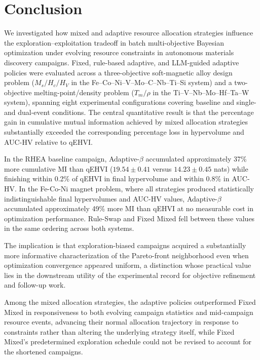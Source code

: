 \section{Conclusion}

We investigated how mixed and adaptive resource allocation strategies influence the exploration--exploitation tradeoff in batch multi-objective Bayesian optimization under evolving resource constraints in autonomous materials discovery campaigns. Fixed, rule-based adaptive, and LLM-guided adaptive policies were evaluated across a three-objective soft-magnetic alloy design problem ($M_s/H_c/H_V$ in the Fe--Co--Ni--V--Mo--C--Nb--Ti--Si system) and a two-objective melting-point/density problem ($T_m/\rho$ in the Ti--V--Nb--Mo--Hf--Ta--W system), spanning eight experimental configurations covering baseline and single- and dual-event conditions.
The central quantitative result is that the percentage gain in cumulative mutual information achieved by mixed allocation strategies substantially exceeded the corresponding percentage loss in hypervolume and AUC-HV relative to qEHVI. 

In the RHEA baseline campaign, Adaptive-$\beta$ accumulated approximately 37\% more cumulative MI than qEHVI ($19.54 \pm 0.41$ versus $14.23 \pm 0.45$ nats) while finishing within 0.2\% of qEHVI in final hypervolume and within 0.8\% in AUC-HV. In the Fe-Co-Ni magnet problem, where all strategies produced statistically indistinguishable final hypervolumes and AUC-HV values, Adaptive-$\beta$ accumulated approximately 49\% more MI than qEHVI at no measurable cost in optimization performance. Rule-Swap and Fixed Mixed fell between these values in the same ordering across both systems. 

The implication is that exploration-biased campaigns acquired a substantially more informative characterization of the Pareto-front neighborhood even when optimization convergence appeared uniform, a distinction whose practical value lies in the downstream utility of the experimental record for objective refinement and follow-up work.

Among the mixed allocation strategies, the adaptive policies outperformed Fixed Mixed in responsiveness to both evolving campaign statistics and mid-campaign resource events, advancing their normal allocation trajectory in response to constraints rather than altering the underlying strategy itself, while Fixed Mixed's predetermined exploration schedule could not be revised to account for the shortened campaigns.

